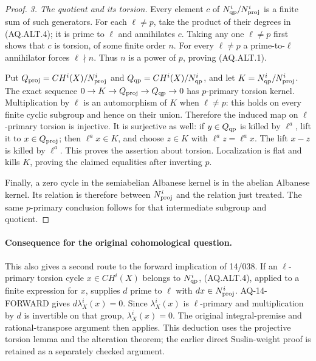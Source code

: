 \begin{proof}
\emph{3. The quotient and its torsion.}
Every element $c$ of $N^i_{\rm qp}/N^i_{\rm proj}$
is a finite sum of such generators.  For each
$\ell\ne p$, take the product of their degrees in
(AQ.ALT.4); it is prime to $\ell$ and annihilates $c$.
Taking any one $\ell\ne p$ first shows that $c$ is
torsion, of some finite order $n$.  For every
$\ell\ne p$ a prime-to-$\ell$ annihilator forces
$\ell\nmid n$.  Thus $n$ is a power of $p$, proving
(AQ.ALT.1).

Put $Q_{\rm proj}=CH^i(X)/N^i_{\rm proj}$ and
$Q_{\rm qp}=CH^i(X)/N^i_{\rm qp}$, and let
$K=N^i_{\rm qp}/N^i_{\rm proj}$.
The exact sequence
$0\to K\to Q_{\rm proj}\to Q_{\rm qp}\to0$
has $p$-primary torsion kernel.  Multiplication by
$\ell$ is an automorphism of $K$ when $\ell\ne p$:
this holds on every finite cyclic subgroup and hence
on their union.  Therefore the induced map on
$\ell$-primary torsion is injective.  It is surjective
as well: if $y\in Q_{\rm qp}$ is killed by
$\ell^a$, lift it to $x\in Q_{\rm proj}$;
then $\ell^a x\in K$, and choose $z\in K$ with
$\ell^a z=\ell^a x$.  The lift $x-z$ is killed by
$\ell^a$.  This proves the assertion about torsion.
Localization is flat and kills $K$, proving the
claimed equalities after inverting $p$.

Finally, a zero cycle in the semiabelian Albanese
kernel is in the abelian Albanese kernel.  Its relation
is therefore between $N^i_{\rm proj}$ and the relation
just treated.  The same $p$-primary conclusion follows
for that intermediate subgroup and quotient.
\end{proof}

\paragraph{Consequence for the original cohomological question.}
This also gives a second route to the forward implication
of 14/038.  If an $\ell$-primary torsion cycle
$x\in CH^i(X)$ belongs to $N^i_{\rm qp}$, (AQ.ALT.4),
applied to a finite expression for $x$, supplies
$d$ prime to $\ell$ with $dx\in N^i_{\rm proj}$.
AQ-14-FORWARD gives $d\lambda_X^i(x)=0$.
Since $\lambda_X^i(x)$ is $\ell$-primary and
multiplication by $d$ is invertible on that group,
$\lambda_X^i(x)=0$.
The original integral-premise and rational-transpose
argument then applies.  This deduction uses the
projective torsion lemma and the alteration theorem;
the earlier direct Suslin-weight proof is retained
as a separately checked argument.

